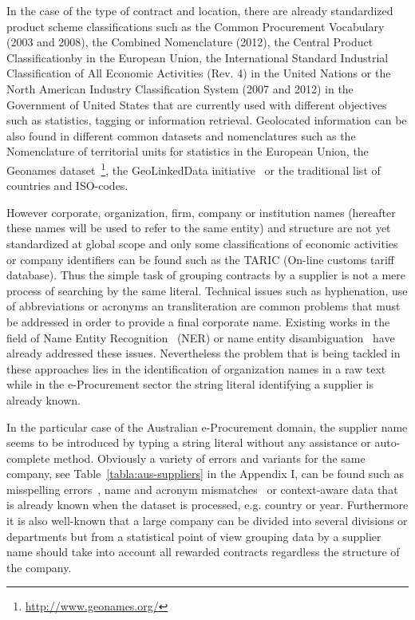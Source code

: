 \documentclass{llncs}
\begin{document}
In the case of the type of contract and location, there are already standardized~\cite{DBLP:journals/ijseke/AlvarezLSASL12,pscsODBook} product 
scheme classifications such as the Common Procurement Vocabulary (2003 and 2008), the Combined Nomenclature (2012), 
the Central Product Classificationby in the European Union, the International Standard Industrial Classification of 
All Economic Activities (Rev. 4) in the United Nations or the North American Industry Classification System (2007 and 2012) 
in the Government of United States that are currently used with different objectives such as statistics, tagging or 
information retrieval. Geolocated information can be also found in different common datasets and nomenclatures such as 
the Nomenclature of territorial units for statistics in the European Union, the Geonames dataset~\footnote{\url{http://www.geonames.org/}}, the GeoLinkedData 
initiative~\cite{DBLP:conf/dexa/Lopez-PellicerSCZM10} or the traditional list of countries and ISO-codes.

However corporate, organization, firm, company or institution names (hereafter these names will be used to refer to 
the same entity) and structure are not yet standardized at global scope and only some classifications of economic activities or 
company identifiers can be found such as the TARIC (On-line customs tariff database). 
Thus the simple task of grouping contracts by a supplier is not a mere process of searching by the same literal. 
Technical issues such as hyphenation, use of abbreviations or acronyms an transliteration are common problems that must be addressed in order 
to provide a final corporate name. Existing works in the field of Name Entity Recognition~\cite{citeulike:1657521} (NER) or 
name entity disambiguation~\cite{Sarmento:2009:AWN:1602022.1602085,Klein:2003:NER:1119176.1119204} have already addressed these issues. 
Nevertheless the problem that is being tackled in these approaches lies in the identification of organization names in 
a raw text while in the e-Procurement sector the string literal identifying a supplier is already known.

In the particular case of the Australian e-Procurement domain, the supplier name seems to be introduced by typing a string literal without any assistance or 
auto-complete method. Obviously a variety of errors and variants for the same company, see Table~\ref{tabla:aus-suppliers} in the Appendix I, 
can be found such as misspelling errors~\cite{NorvigSpelling,StanfordSpelling}, name and acronym mismatches~\cite{Yeates99automaticextraction,Ratinov:2004:AES:1025132.1026366} 
or context-aware data that is already known when the dataset is processed, e.g. country or year. Furthermore it is also well-known 
that a large company can be divided into several divisions or departments but from a statistical point of view grouping data by a supplier name 
should take into account all rewarded contracts regardless the structure of the company.
\end{document}
